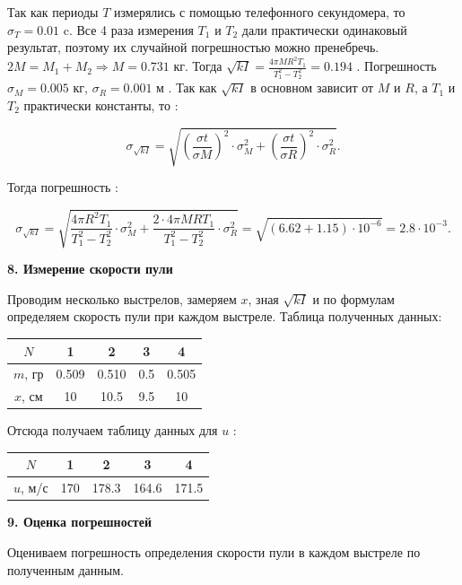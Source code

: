 \documentclass[a4paper,12pt]{article} %
\begin{document}
Так как периоды $T$ измерялись с помощью телефонного секундомера, то $\sigma_T = 0.01$ c. Все 4 раза измерения $T_1$ и $T_2$ дали практически одинаковый результат, поэтому их случайной погрешностью можно пренебречь. $2M = M_1+M_2 \Rightarrow M = 0.731$ кг. Тогда $\sqrt{kI} = \frac{4\pi MR^2 T_1}{T_1^2 - T_2^2} = 0.194$        . Погрешность $\sigma_M = 0.005$ кг, $\sigma_R = 0.001$ м . Так как $\sqrt{kI}$ в основном зависит от $M$ и $R$, а $T_1$ и $T_2$ практически константы, то :  

\[\sigma_{\sqrt{kI}} = \sqrt{(\frac{\sigma t}{\sigma M})^2\cdot \sigma_M^2 + (\frac{\sigma t}{\sigma R})^2\cdot \sigma_R^2}.\]

Тогда погрешность :

\[\sigma_{\sqrt{kI}} = \sqrt{\frac{4\pi R^2 T_1}{T_1^2 - T_2^2} \cdot \sigma_M^2 + \frac{2\cdot 4\pi MRT_1}{T_1^2 - T_2^2}\cdot \sigma_R^2} = \sqrt{(6.62+ 1.15)\cdot 10^{-6}} = 2.8\cdot 10^{-3}.\]


\begin{center}
{\bf 8. Измерение скорости пули}
\end{center}

Проводим несколько выстрелов, замеряем $x$, зная $\sqrt{kI}$ и по формулам определяем скорость пули при каждом выстреле. Таблица полученных данных: 
\begin{center}
\begin{tabular}{|c|c|c|c|c|}
\hline 
$N$ & 1 & 2 & 3 & 4 \\ 
\hline 
$m$, гр & 0.509 & 0.510 & 0.5 & 0.505 \\ 
\hline 
$x$, см & 10 & 10.5 & 9.5 & 10 \\ 
\hline 
\end{tabular} 
\end{center}

Отсюда получаем таблицу данных для $u$ :

\begin{center}
\begin{tabular}{|c|c|c|c|c|}
\hline 
$N$ & 1 & 2 & 3 & 4 \\ 
\hline 
$u$, м/с & 170 & 178.3 & 164.6 & 171.5 \\ 
\hline  
\end{tabular} 
\end{center}


\begin{center}
{\bf 9. Оценка погрешностей}
\end{center}

Оцениваем погрешность определения скорости пули в каждом выстреле по полученным данным.
\end{document}
